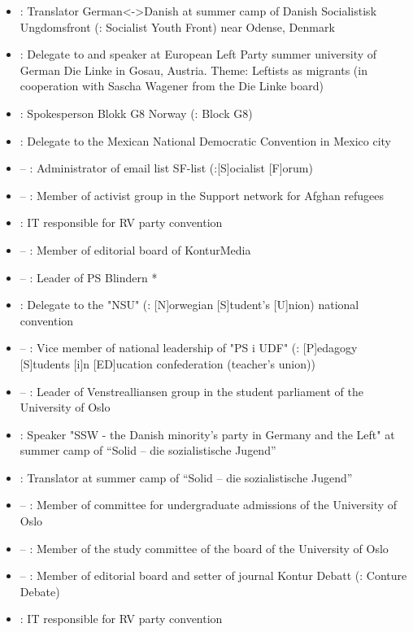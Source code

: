\begin{itemize}
\item {}: Translator German<->Danish at summer camp of Danish Socialistisk Ungdomsfront (\english: Socialist Youth Front) near Odense, Denmark
\item {}: Delegate to and speaker at European Left Party summer university of German Die Linke in Gosau, Austria. Theme: Leftists as migrants (in cooperation with Sascha Wagener from the Die Linke board)
\item {}: Spokesperson Blokk G8 Norway (\english: Block G8)
\item {}: Delegate to the Mexican National Democratic Convention in Mexico city
\item {} – : Administrator of email list SF-list (\english:[S]ocialist [F]orum)
\item {} – : Member of activist group in the Support network for Afghan refugees
\item {}: IT responsible for RV party convention
\item {} – : Member of editorial board of KonturMedia
\item {} – : Leader of PS Blindern *
\item {}: Delegate to the "NSU" (\english: [N]orwegian [S]tudent's [U]nion) national convention
\item {} – : Vice member of national leadership of "PS i UDF" (\english: [P]edagogy [S]tudents [i]n [ED]ucation confederation (teacher's union))
\item {} – : Leader of Venstrealliansen group in the student parliament of the University of Oslo
\item {}: Speaker "SSW - the Danish minority's party in Germany and the Left" at summer camp of “Solid – die sozialistische Jugend”
\item {}: Translator at summer camp of “Solid – die sozialistische Jugend”
\item {} – : Member of committee for undergraduate admissions of the University of Oslo
\item {} – : Member of the study committee of the board of the University of Oslo
\item {} – : Member of editorial board and setter of journal Kontur Debatt (\english: Conture Debate)
\item {}: IT responsible for RV party convention

\end{itemize}
